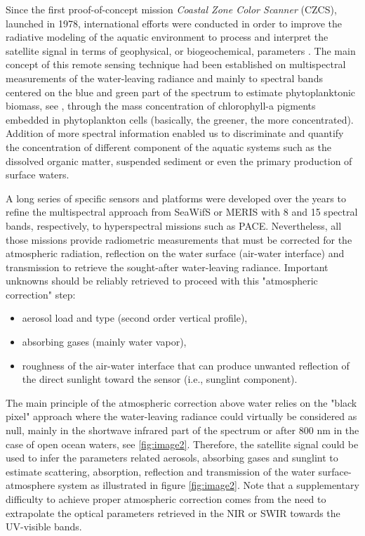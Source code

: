 \documentclass{article}
\begin{document}
Since the first proof-of-concept mission \textit{Coastal Zone Color Scanner} (CZCS), launched in 1978, international efforts were conducted in order to improve the radiative modeling of the aquatic environment to process and interpret the satellite signal in terms of geophysical, or biogeochemical, parameters \cite{McClain2022}. The main concept of this remote sensing technique had been established on multispectral measurements of the water-leaving radiance and mainly to spectral bands centered on the blue and green part of the spectrum to estimate phytoplanktonic biomass, see \cite{Morel1977}, through the mass concentration of chlorophyll-a pigments embedded in phytoplankton cells (basically, the greener, the more concentrated). Addition of more spectral information enabled us to discriminate and quantify the concentration of different component of the aquatic systems such as the dissolved organic matter, suspended sediment or even the primary production of surface waters.

A long series of specific sensors and platforms were developed over the years to refine the multispectral approach from SeaWifS or MERIS with 8 and 15 spectral bands, respectively, to hyperspectral missions such as PACE. Nevertheless, all those missions provide radiometric measurements that must be corrected for the atmospheric radiation, reflection on the water surface (air-water interface) and transmission to retrieve the sought-after water-leaving radiance. Important unknowns should be reliably retrieved to proceed with this "atmospheric correction" step: 
\begin{itemize}
    \item  aerosol load and type (second order vertical profile), 
    \item absorbing gases (mainly water vapor), 
    \item  roughness of the air-water interface that can produce unwanted reflection of the direct sunlight toward the sensor (i.e., sunglint component).
\end{itemize}

The main principle of the atmospheric correction above water relies on the "black pixel" approach where the water-leaving radiance could virtually be considered as null, mainly in the shortwave infrared part of the spectrum or after 800 nm in the case of open ocean waters, see \ref{fig:image2}. Therefore, the satellite signal could be used to infer the parameters related aerosols, absorbing gases and sunglint to estimate scattering, absorption, reflection and transmission of the water surface-atmosphere system as illustrated in figure \ref{fig:image2}. Note that a supplementary difficulty to achieve proper atmospheric correction comes from the need to extrapolate the optical parameters retrieved in the NIR or SWIR towards the UV-visible bands. 
\end{document}
